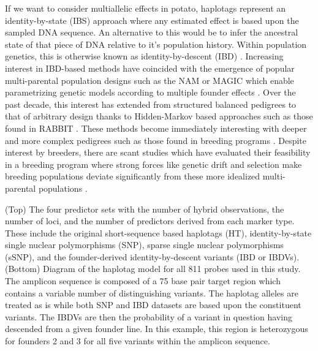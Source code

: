 \begin{refsection}
If we want to consider multiallelic effects in potato, haplotags
represent an identity-by-state (IBS) approach where any estimated effect
is based upon the sampled DNA sequence. An alternative to this would be
to infer the ancestral state of that piece of DNA relative to it's
population history. Within population genetics, this is otherwise known as
identity-by-descent (IBD) \parencite{Falconer1996}. Increasing interest
in IBD-based methods have coincided with the emergence of popular
multi-parental population designs such as the NAM or MAGIC which enable
parametrizing genetic models according to multiple founder effects
\parencite{Li2021,Garin2021}. Over the past decade, this interest has
extended from structured balanced pedigrees to that of arbitrary design
thanks to Hidden-Markov based approaches such as those found in RABBIT
\parencite{Zheng2015}. These methods become immediately interesting with
deeper and more complex pedigrees such as those found in breeding
programs \parencite{Tisne2015,VanEeuwijk2010}. Despite interest by
breeders, there are scant studies which have evaluated their feasibility
in a breeding program where strong forces like genetic drift and
selection make breeding populations deviate significantly from these
more idealized multi-parental populations \parencite{Hill2014, Garin2021}.

\begin{tcolorbox}[enhanced jigsaw, opacitybacktitle=1, bottomtitle=1mm, colback=blue!5, arc=.35mm, opacityback=1, breakable=false, left=2mm, titlerule=0mm, rightrule=.15mm, toprule=.15mm, colbacktitle=blue!10!white, colframe=black, bottomrule=.15mm, coltitle=black, toptitle=1mm, title={Table 1 Description of four probesets used in hybrid prediction}, leftrule=.75mm]
(Top) The four predictor sets with the number of hybrid observations,
the number of loci, and the
number of predictors derived from each marker type. These include the
original short-sequence based haplotags (HT), identity-by-state single nuclear polymorphisms (SNP), sparse single nuclear polymorphisms (sSNP), and the
founder-derived identity-by-descent variants (IBD or IBDVs). (Bottom) Diagram of the haplotag model for all 811 probes
used in this study. The amplicon sequence is composed of a 75 base pair
        target region which contains a variable number of distinguishing variants. The haplotag alleles are treated as is while both SNP and IBD datasets are based upon the constituent variants. The IBDVs are then the probability of a variant in question having descended from a given founder line. In this example, this region is heterozygous for founders 2 and 3 for all five variants within the amplicon sequence.


\end{tcolorbox}
\end{refsection}
